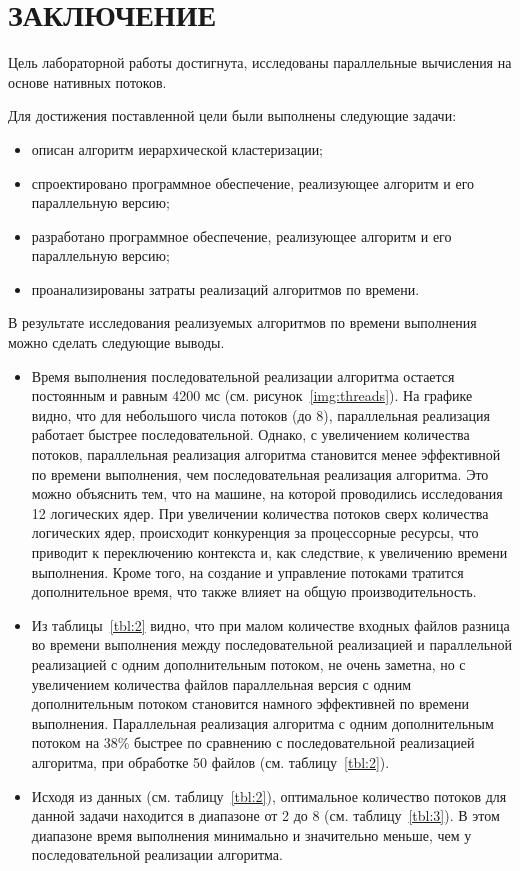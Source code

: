 \chapter*{ЗАКЛЮЧЕНИЕ}

Цель лабораторной работы достигнута, исследованы параллельные вычисления на основе нативных потоков.

Для достижения поставленной цели были выполнены следующие задачи:
\begin{itemize}
	\item описан алгоритм иерархической кластеризации;
	\item спроектировано программное обеспечение, реализующее алгоритм и его параллельную версию;
	\item разработано программное обеспечение, реализующее алгоритм и его
	параллельную версию;
	\item проанализированы затраты реализаций алгоритмов по времени.
\end{itemize}

В результате исследования реализуемых алгоритмов по времени выполнения можно сделать следующие выводы.
\begin{itemize}
	\item Время выполнения последовательной реализации алгоритма остается постоянным и равным 4200 мс (см. рисунок~\ref{img:threads}). На графике видно, что для небольшого числа потоков (до 8), параллельная реализация работает быстрее последовательной. Однако, с увеличением количества потоков, параллельная реализация алгоритма становится менее эффективной по времени выполнения, чем последовательная реализация алгоритма. Это можно объяснить тем, что на машине, на которой проводились исследования 12 логических ядер. При увеличении количества потоков сверх количества логических ядер, происходит конкуренция за процессорные ресурсы, что приводит к переключению контекста и, как следствие, к увеличению времени выполнения. Кроме того, на создание и управление потоками тратится дополнительное время, что также влияет на общую производительность. 
	
	\item Из таблицы~\ref{tbl:2} видно, что при малом количестве входных файлов разница во времени выполнения между последовательной реализацией и параллельной реализацией с одним дополнительным потоком, не очень заметна, но с увеличением количества файлов параллельная версия с одним дополнительным потоком становится намного эффективней по времени выполнения.
	Параллельная реализация алгоритма с одним дополнительным потоком на 38\% быстрее по сравнению с последовательной реализацией алгоритма, при обработке 50 файлов (см. таблицу~\ref{tbl:2}).
	
	\item Исходя из данных (см. таблицу~\ref{tbl:2}), оптимальное количество потоков для данной задачи находится в диапазоне от 2 до 8 (см. таблицу~\ref{tbl:3}). В этом диапазоне время выполнения минимально и значительно меньше, чем у последовательной реализации алгоритма.
\end{itemize}
